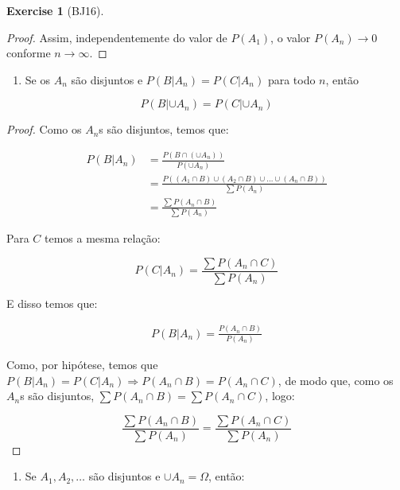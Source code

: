 \documentclass[
]{article}
\providecommand{\tightlist}{%
  \setlength{\itemsep}{0pt}\setlength{\parskip}{0pt}}
\theoremstyle{definition}
\theoremstyle{definition}
\theoremstyle{definition}
\newtheorem{exercise}{Exercise}[section]
\theoremstyle{definition}
\theoremstyle{remark}
\begin{document}
\begin{exercise}[BJ16]
\begin{proof}
Assim, independentemente do valor de \(P(A_{1})\), o valor \(P(A_{n}) \to 0\) conforme \(n \to \infty\).
\end{proof}

\begin{enumerate}
\def\labelenumi{\alph{enumi})}
\setcounter{enumi}{3}
\tightlist
\item
  Se os \(A_{n}\) são disjuntos e \(P(B|A_{n}) = P(C|A_{n})\) para todo \(n\), então
\end{enumerate}

\begin{equation*}
P(B|\cup A_{n}) = P(C|\cup A_{n})
\end{equation*}

\begin{proof}
Como os \(A_{n}\)s são disjuntos, temos que:

\begin{align*}
P(B|A_{n}) &= \frac{P(B \cap (\cup A_{n}))}{P(\cup A_{n})} \\
&= \frac{P((A_{1} \cap B) \cup (A_{2} \cap B) \cup \dots \cup (A_{n} \cap B))}{\sum P(A_{n})} \\
&= \frac{\sum P(A_{n} \cap B)}{\sum P(A_{n})}
\end{align*}

Para \(C\) temos a mesma relação:

\begin{equation*}
P(C|A_{n}) = \frac{\sum P(A_{n} \cap C)}{\sum P(A_{n})}
\end{equation*}

E disso temos que:

\begin{align*}
P(B|A_{n}) = \frac{P(A_{n} \cap B)}{P(A_{n})}
\end{align*}

Como, por hipótese, temos que \(P(B|A_{n}) = P(C|A_{n}) \Rightarrow P(A_{n} \cap B) = P(A_{n} \cap C)\), de modo que, como os \(A_{n}\)s são disjuntos, \(\sum P(A_{n} \cap B) = \sum P(A_{n} \cap C)\), logo:

\begin{equation*}
\frac{\sum P(A_{n} \cap B)}{\sum P(A_{n})} = \frac{\sum P(A_{n} \cap C)}{\sum P(A_{n})}
\end{equation*}
\end{proof}

\begin{enumerate}
\def\labelenumi{\alph{enumi})}
\setcounter{enumi}{4}
\tightlist
\item
  Se \(A_{1}, A_{2}, \ldots\) são disjuntos e \(\cup A_{n} = \Omega\), então:
\end{enumerate}


\end{exercise}
\end{document}
